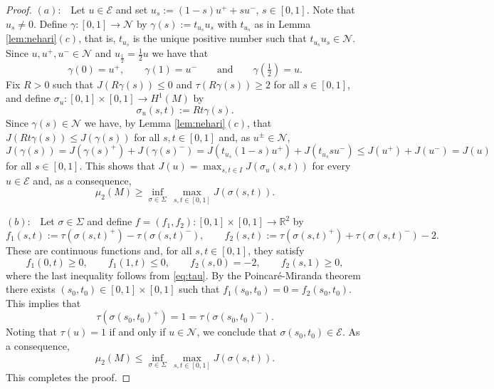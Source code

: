 \documentclass[reqno,11pt,oneside]{amsart}
\numberwithin{equation}{section}
\def\r{\mathbb{R}}
\def\cE{\mathcal{E}}
\def\cN{\mathcal{N}}
\begin{document}
\begin{proof}
$(a):$ \ Let $u\in\cE$ and set $u_s:=(1-s)u^++su^-$, $s\in[0,1]$. Note that $u_s\neq 0$. Define $\gamma:[0,1]\to\cN$ by $\gamma(s):=t_{u_s}u_s$ with $t_{u_s}$ as in Lemma \ref{lem:nehari}$(c)$, that is, $t_{u_s}$ is the unique positive number such that $t_{u_s}u_s\in\cN$. Since $u,u^+,u^-\in\cN$ and $u_\frac{1}{2}=\frac{1}{2}u$ we have that
$$\gamma(0)=u^+, \qquad \gamma(1)=u^-\qquad \text{and}\qquad \gamma(\tfrac{1}{2})=u.$$
Fix $R>0$ such that $J(R\gamma(s))\leq 0$ and $\tau(R\gamma(s))\geq 2$ for all $s\in[0,1]$, and define $\sigma_u:[0,1]\times[0,1]\to H^1(M)$ by
$$\sigma_u(s,t):=Rt\gamma(s).$$
Since $\gamma(s)\in\cN$ we have, by Lemma \ref{lem:nehari}$(c)$, that $J(Rt\gamma(s))\leq J(\gamma(s))$ for all $s,t\in[0,1]$ and, as $u^\pm\in\cN$,
$$J(\gamma(s))=J(\gamma(s)^+)+J(\gamma(s)^-)=J(t_{u_s}(1-s)u^+)+J(t_{u_s}su^-)\leq J(u^+)+J(u^-)=J(u)$$
for all $s\in[0,1]$. This shows that $J(u)=\max_{s,t\in I} J(\sigma_u(s,t))$ for every $u\in\cE$ and, as a consequence, 
$$\mu_2(M)\geq\inf_{\sigma\in\Sigma}\,\max_{s,t\in[0,1]}J(\sigma(s,t)).$$

$(b):$ \ Let $\sigma\in\Sigma$ and define $f=(f_1,f_2):[0,1]\times[0,1]\to\r^2$ by
$$f_1(s,t):=\tau(\sigma(s,t)^+)-\tau(\sigma(s,t)^-),\qquad f_2(s,t):=\tau(\sigma(s,t)^+)+\tau(\sigma(s,t)^-)-2.$$
These are continuous functions and, for all $s,t\in [0,1]$, they satisfy
$$f_1(0,t)\geq 0,\qquad f_1(1,t)\leq 0, \qquad f_2(s,0)=-2,\qquad f_2(s,1)\geq 0,$$
where the last inequality follows from \eqref{eq:tau}. By the Poincaré-Miranda theorem \cite{k} there exists $(s_0,t_0)\in[0,1]\times[0,1]$ such that $f_1(s_0,t_0)=0=f_2(s_0,t_0)$. This implies that 
$$\tau(\sigma(s_0,t_0)^+)=1=\tau(\sigma(s_0,t_0)^-).$$
Noting that $\tau(u)=1$ if and only if $u\in\cN$, we conclude that $\sigma(s_0,t_0)\in\cE$. As a consequence, 
$$\mu_2(M)\leq\inf_{\sigma\in\Sigma}\,\max_{s,t\in[0,1]}J(\sigma(s,t)).$$
This completes the proof.
\end{proof}
\end{document}
